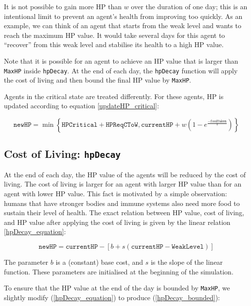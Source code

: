 It is not possible to gain more HP than $w$ over the duration of one day; this is an intentional limit to prevent an agent's health from improving too quickly. As an example, we can think of an agent that starts from the weak level and wants to reach the maximum HP value. It would take several days for this agent to ``recover'' from this weak level and stabilise its health to a high HP value. 

Note that it is possible for an agent to achieve an HP value that is larger than \texttt{MaxHP} inside \lstinline$hpDecay$. At the end of each day, the \lstinline$hpDecay$ function will apply the cost of living and then bound the final HP value by \lstinline$MaxHP$.


Agents in the critical state are treated differently. For these agents, HP is updated according to equation \eqref{updateHP_critical}:

\begin{equation}\label{updateHP_critical}
    \texttt{newHP} = \min\left\{\texttt{HPCritical}+\texttt{HPReqCToW}, \texttt{currentHP} +w(1-e^{\frac{-\texttt{foodTaken}}{\tau}})\right\}
\end{equation}

\subsection{Cost of Living: \texorpdfstring{\texttt{hpDecay}}{hpDecay}}\label{hpDecay}
At the end of each day, the HP value of the agents will be reduced by the cost of living. The cost of living is larger for an agent with larger HP value than for an agent with lower HP value. This fact is motivated by a simple observation: humans that have stronger bodies and immune systems also need more food to sustain their level of health. The exact relation between HP value, cost of living, and HP value after applying the cost of living is given by the linear relation \eqref{hpDecay_equation}:

\begin{equation}\label{hpDecay_equation}
    \texttt{newHP} = \texttt{currentHP}-\left[b + s(\texttt{currentHP}-\texttt{WeakLevel})\right]
\end{equation}


The parameter $b$ is a (constant) base cost, and $s$ is the slope of the linear function. These parameters are initialised at the beginning of the simulation.

To ensure that the HP value at the end of the day is bounded by \texttt{MaxHP}, we slightly modify (\ref{hpDecay_equation}) to produce (\ref{hpDecay_bounded}):

